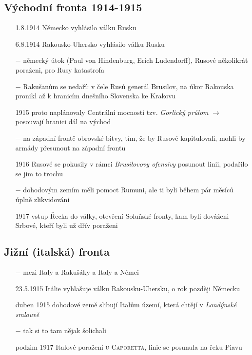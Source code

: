 \documentclass{article}
\begin{document}
\subsection*{Východní fronta 1914-1915}
\begin{itemize}
    \vspace{-0.5em}
    \setlength\itemsep{0.15em}
    \item[1.8.1914] Německo vyhlásilo válku Rusku
    \item[6.8.1914] Rakousko-Uhersko vyhlásilo válku Rusku
    \item[$-$] německý útok (Paul von Hindenburg, Erich Ludendorff), Rusové několikrát poraženi, pro Rusy katastrofa
    \item[$-$] Rakušanům se nedaří: v čele Rusů generál Brusilov, na úkor Rakouska pronikl až k hranicím dnešního Slovenska ke Krakovu
    \item[1915] proto naplánovaly Centrální mocnosti tzv. \textit{Gorlický průlom} $\rightarrow$ posouvají hranici dál na východ
    \item[$-$] na západní frontě obrovské bitvy, tím, že by Rusové kapitulovali, mohli by armády přesunout na západní frontu
    \item[1916] Rusové se pokusily v rámci \textit{Brusilovovy ofensivy} posunout linii, podařilo se jim to trochu
    \item[$-$] dohodovým zemím měli pomoct Rumuni, ale ti byli během pár měsíců úplně zlikvidováni
    \item[1917] vstup Řecka do války, otevření Soluňské fronty, kam byli dováženi Srbové, kteří byli už dřív poraženi
\end{itemize}

\subsection*{Jižní (italská) fronta}
\begin{itemize}
    \vspace{-0.5em}
    \setlength\itemsep{0.15em}
    \item[$-$] mezi Italy a Rakušáky a Italy a Němci
    \item[23.5.1915] Itálie vyhlašuje válku Rakousku-Uhersku, o rok později Německu
    \item[duben 1915] dohodové země slibují Italům území, která chtějí v \textit{Londýnské smlouvě}
    \item[$-$] tak si to tam nějak šolichali
    \item[podzim 1917] Italové poraženi \textsc{u Caporetta}, linie se posunula na řeku Piavu
\end{itemize}
\end{document}
